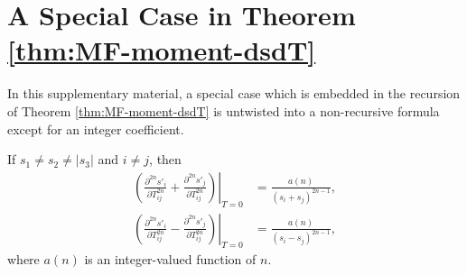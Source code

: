 \appendix
\doublespacing

\chapter{A Special Case in Theorem \ref{thm:MF-moment-dsdT}} \label{app:MF-moment-specialRecursion}

In this supplementary material, a special case which is embedded in the recursion of Theorem \eqref{thm:MF-moment-dsdT} is untwisted into a non-recursive formula except for an integer coefficient.

\begin{theorem} \label{thm:MF-moment-specialRecursion}
	If $s_1 \neq s_2 \neq |s_3|$ and $i \neq j$, then
	\begin{align} \label{eqn:dsisjdT}
		\left.\left( \frac{\partial^{2n}s'_i}{\partial T_{ij}^{2n}} + \frac{\partial^{2n}s'_j}{\partial T_{ij}^{2n}} \right)\right|_{T=0} &= \frac{a(n)}{(s_i+s_j)^{2n-1}}, \nonumber \\
		\left.\left( \frac{\partial^{2n}s'_i}{\partial T_{ij}^{2n}} - \frac{\partial^{2n}s'_j}{\partial T_{ij}^{2n}} \right)\right|_{T=0} &= \frac{a(n)}{(s_i-s_j)^{2n-1}},
	\end{align}
	where $a(n)$ is an integer-valued function of $n$.
\end{theorem}

